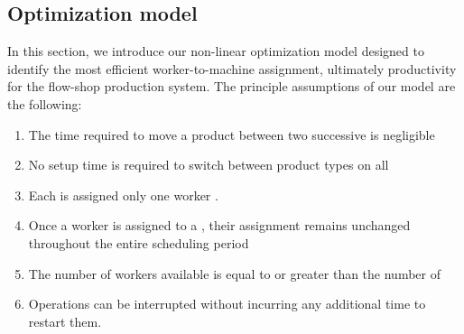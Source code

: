 \documentclass[review,12pt, 3p, times]{elsarticle}
\begin{document}
\subsection{Optimization model}\label{sec:Pre_mod}
In this section, we introduce our non-linear optimization model designed to identify the most efficient worker-to-machine assignment, ultimately  productivity for the  flow-shop production system. 
The principle assumptions of our model are the following:
\begin{enumerate}
    \item  The time required to move a product between two successive  is negligible 
    \item No setup time is required to switch between product types on all  
    \item Each  is assigned only one worker . 
    \item Once a worker is assigned to a , their assignment remains unchanged throughout the entire scheduling period
    \item The number of workers available is equal to or greater than the number of 
    \item Operations can be interrupted without incurring any additional time to restart them.
\end{enumerate}
\end{document}

